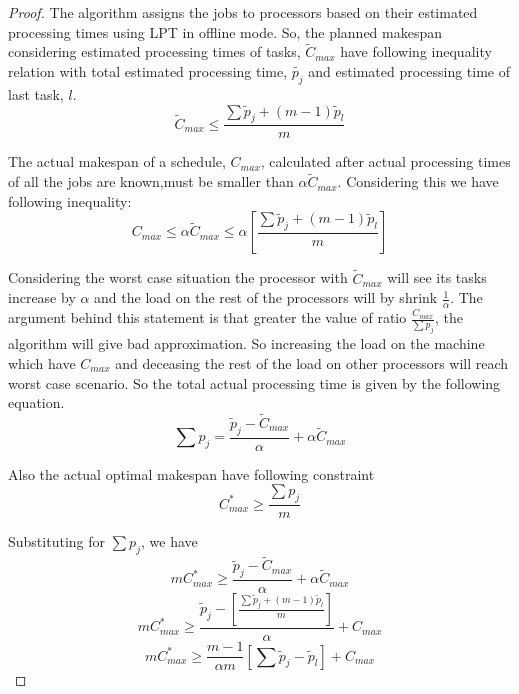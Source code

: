 \documentclass[10pt, conference, compsocconf]{IEEEtran}
\begin{document}
\begin{proof}
The algorithm assigns the jobs to processors based on their estimated processing times using LPT in offline mode. So, the planned makespan considering estimated processing times of tasks, $\tilde{C}_{max}$ have following inequality relation with total estimated processing time, $\tilde{p_j}$ and estimated processing time of last task, $l$. 
\begin{equation}\label{eq2}
\tilde C_{max}\leq  \frac{\sum{\tilde p_j + (m-1) \tilde p_l} }{m}
\end{equation}

The actual makespan of a schedule, $C_{max}$, calculated after actual processing times of all the jobs are known,must be smaller than $\alpha\tilde C_{max}$. Considering this we have following inequality:
\begin{equation}\label{eq3}
 C_{max}\leq \alpha \tilde C_{max}\leq \alpha [\frac{\sum{\tilde p_j + (m-1) \tilde p_l} }{m}] 
\end{equation} 

Considering the worst case situation the processor with $\tilde C_{max}$ will see its tasks increase by $\alpha$  and the load on the  rest of the processors will by shrink  $\frac{1}{\alpha}$.  The argument behind this statement is that greater the value of ratio $\frac{C_{max}}{\sum{p_j}}$, the algorithm will give bad approximation. So increasing the load on the machine which have $C_{max} $ and deceasing the rest of the load on other processors will reach worst case scenario. So the total actual processing time is given by the  following equation.
 \begin{equation}\label{eq4}
 \sum {p_j} = \frac{\tilde p_j- \tilde C_{max}}{\alpha} + \alpha \tilde C_{max}
 \end{equation}
 
 Also the actual optimal makespan have following constraint
 \begin{equation}\nonumber 
C_{max}^{*}\geq \frac{\sum {p_j}}{m}
\end{equation}

Substituting for  $ \sum {p_j}$, we have
 \begin{equation}\nonumber 
 m C_{max}^{*}\geq \frac{\tilde p_j- \tilde C_{max}}{\alpha} + \alpha \tilde C_{max}
 \end{equation} 
\begin{equation}\nonumber 
 m C_{max}^{*}\geq \frac{\tilde p_j-[\frac{\sum{\tilde p_j + (m-1) \tilde p_l }}{m}]} {\alpha} + {C_{max}}
\end{equation}
\begin{equation}\nonumber
 m C_{max}^{*}\geq \frac{m-1}{\alpha m} [\sum \tilde p_j-\tilde p_l] + {C_{max}}
 \end{equation}


\end{proof}
\end{document}

